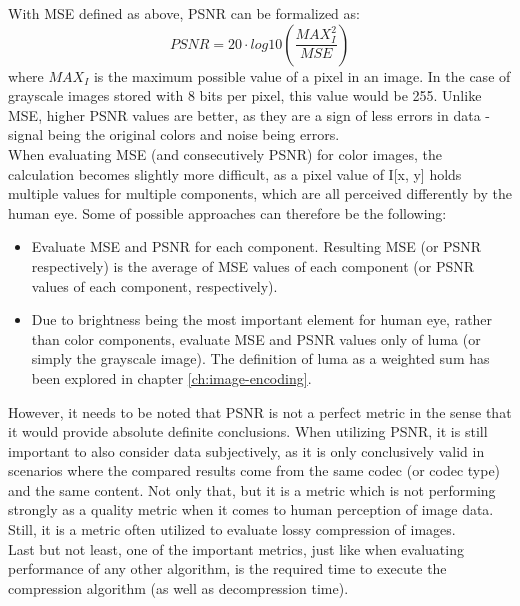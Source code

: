 \documentclass[thesis=M,english]{FITthesis}[2012/10/20]
\begin{document}
With MSE defined as above, PSNR can be formalized as:
\begin{equation}
    PSNR = 20 \cdot log10 \left( \frac{MAX^2_I}{MSE} \right)
\end{equation}
where $MAX_I$ is the maximum possible value of a pixel in an image. In the
case of grayscale images stored with 8 bits per pixel, this value would
be 255. Unlike MSE, higher PSNR values are better, as they are a sign of less errors
in data - signal being the original colors and noise being errors.
\\

When evaluating MSE (and consecutively PSNR) for color images, the calculation becomes
slightly more difficult, as a pixel value of I[x, y] holds multiple values for multiple
components, which are all perceived differently by the human eye. Some of possible approaches
can therefore be the following:
\begin{itemize}
  \item Evaluate MSE and PSNR for each component. Resulting MSE (or PSNR respectively)
  is the average of MSE values of each component (or PSNR values of each component, 
  respectively).
  \item Due to brightness being the most important element for human eye, rather than
  color components, evaluate MSE and PSNR values only of luma (or simply the grayscale
  image). The definition of luma as a weighted sum has been explored in chapter \ref{ch:image-encoding}.
\end{itemize}
\cite{matlab18}\cite{netpbm}

However, it needs to be noted that PSNR is not a perfect metric in the sense
that it would provide absolute definite conclusions. When utilizing PSNR, it is
still important to also consider data subjectively, as it is only conclusively
valid in scenarios where the compared results come from the same codec (or codec
type) and the same content. Not only that, but it is a metric which is not
performing strongly as a quality metric when it comes to human perception
of image data. \cite{psnrsucks1} \cite{psnrsucks2} Still, it is a metric often
utilized to evaluate lossy compression
of images.
\\

Last but not least, one of the important metrics, just like when
evaluating performance of any other algorithm, is the required
time to execute the compression algorithm (as well as decompression
time).
\end{document}
